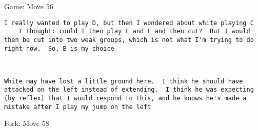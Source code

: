 \documentclass{article}
\begin{document}
\begin{section}{Game: Move 56}
\begin{center}
\begin{lstlisting}
I really wanted to play D, but then I wondered about white playing C
	I thought: could I then play E and F and then cut?  But I would then be cut into two weak groups, which is not what I'm trying to do right now.  So, B is my choice\end{lstlisting}
\end{center}
\begin{center}
\cleargoban
{}
\showfullgoban
\\\begin{lstlisting}
White may have lost a little ground here.  I think he should have attacked on the left instead of extending.  I think he was expecting (by reflex) that I would respond to this, and he knows he's made a mistake after I play my jump on the left\end{lstlisting}
\end{center}
\end{section}
\begin{subsection}{Fork: Move 58}
\end{subsection}
\newpage
\end{document}
